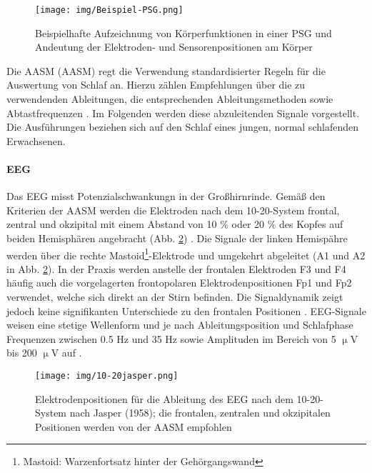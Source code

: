 \begin{figure}[H]
	\centering
	\texttt{[image: img/Beispiel-PSG.png]}
	\caption[Beispielhafte \acs{PSG}]{Beispielhafte Aufzeichnung von Körperfunktionen in einer \acs{PSG} und Andeutung der Elektroden- und Sensorenpositionen am Körper \parencite{penzel_schlafstorungen_2005}}
	\label{fig:beispiel-psg}
\end{figure}

Die \acl{AASM} (\acs{AASM}) regt die Verwendung standardisierter Regeln für die Auswertung von Schlaf an. Hierzu zählen Empfehlungen über die zu verwendenden Ableitungen, die entsprechenden Ableitungsmethoden sowie Abtastfrequenzen \parencite{iber_aasm_2007}. Im Folgenden werden diese abzuleitenden Signale vorgestellt. Die Ausführungen beziehen sich auf den Schlaf eines jungen, normal schlafenden Erwachsenen.\\

\paragraph{\acs{EEG}}
Das \acs{EEG} misst Potenzialschwankungn in der Großhirnrinde. Gemäß den Kriterien der \acs{AASM} werden die Elektroden nach dem 10-20-System frontal, zentral und okzipital mit einem Abstand von 10 \% oder 20 \% des Kopfes auf beiden Hemisphären angebracht (Abb. \ref{fig:10-20jasper}) \parencite{iber_aasm_2007}. Die Signale der linken Hemispähre werden über die rechte Mastoid\footnote{Mastoid: Warzenfortsatz hinter der Gehörgangswand}-Elektrode und umgekehrt abgeleitet (A1 und A2 in Abb. \ref{fig:10-20jasper}). In der Praxis werden anstelle der frontalen Elektroden F3 und F4 häufig auch die vorgelagerten frontopolaren Elektrodenpositionen Fp1 und Fp2 verwendet, welche sich direkt an der Stirn befinden. Die Signaldynamik zeigt jedoch keine signifikanten Unterschiede zu den frontalen Positionen \parencite{dorffner_effects_2015}. \acs{EEG}-Signale weisen eine stetige Wellenform und je nach Ableitungsposition und Schlafphase Frequenzen zwischen 0.5 Hz und 35 Hz sowie Amplituden im Bereich von 5 $\upmu$V bis 200 $\upmu$V auf \parencite{lee-chiong_sleep_2008}.

\begin{figure}[H]
	\centering
	\texttt{[image: img/10-20jasper.png]}
	\caption[Elektrodenpositionen des \acs{EEG}]{Elektrodenpositionen für die Ableitung des \acs{EEG} nach dem 10-20-System nach Jasper (1958); die frontalen, zentralen und okzipitalen Positionen werden von der \acs{AASM} empfohlen \parencite{kemp_edf+:_????}}
	\label{fig:10-20jasper}
\end{figure}

